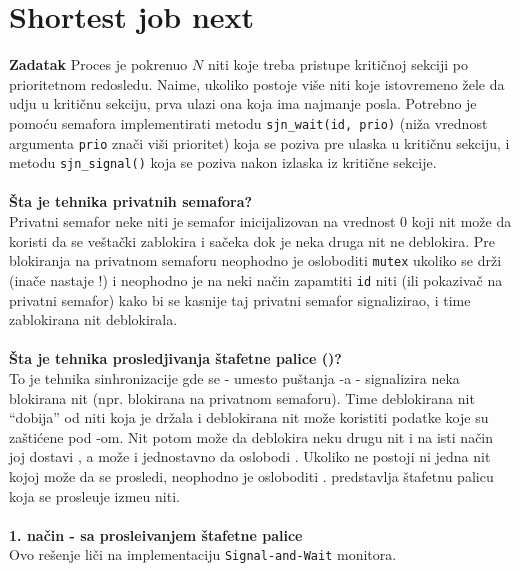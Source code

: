 \clearpage
\section{\latin Shortest job next}
\textbf{\large Zadatak} Proces je pokrenuo $N$ niti koje treba pristupe kriti\v{c}noj sekciji po prioritetnom redosledu. Naime, ukoliko postoje vi\v{s}e niti koje istovremeno \v{z}ele da udju u kriti\v{c}nu sekciju, prva ulazi ona koja ima najmanje posla. Potrebno je pomo\'{c}u semafora implementirati metodu \texttt{sjn\_wait(id, prio)} (ni\v{z}a vrednost argumenta \texttt{prio} zna\v{c}i vi\v{s}i prioritet) koja se poziva pre ulaska u kriti\v{c}nu sekciju, i metodu \texttt{sjn\_signal()} koja se poziva nakon izlaska iz kriti\v{c}ne sekcije.
\\\\
\textbf{\v{S}ta je tehnika privatnih semafora?}\\
Privatni semafor neke niti je semafor inicijalizovan na vrednost 0 koji nit mo\v{z}e da koristi da se ve\v{s}ta\v{c}ki zablokira i sa\v{c}eka dok je neka druga nit ne deblokira. Pre blokiranja na privatnom semaforu neophodno je osloboditi \texttt{mutex} ukoliko se dr\v{z}i (ina\v{c}e nastaje !) i neophodno je na neki na\v{c}in zapamtiti \texttt{id} niti (ili pokaziva\v{c} na privatni semafor) kako bi se kasnije taj privatni semafor signalizirao, i time zablokirana nit deblokirala.\\\\
\textbf{\v{S}ta je tehnika prosledjivanja \v{s}tafetne palice ()?}\\
To je tehnika sinhronizacije gde se - umesto pu\v{s}tanja -a - signalizira neka blokirana nit (npr. blokirana na privatnom semaforu). Time deblokirana nit ``dobija''  od niti koja je dr\v{z}ala  i deblokirana nit mo\v{z}e koristiti podatke koje su za\v{s}ti\'{c}ene pod -om. Nit potom mo\v{z}e da deblokira neku drugu nit i na isti na\v{c}in joj dostavi , a mo\v{z}e i jednostavno da oslobodi . Ukoliko ne postoji ni jedna nit kojoj  mo\v{z}e da se prosledi, neophodno je osloboditi .  predstavlja \v{s}tafetnu palicu koja se prosle\dj{}uje izme\dj{}u niti.
\\\\
\textbf{\large 1. na\v{c}in - sa prosle\dj{}ivanjem \v{s}tafetne palice}\\
Ovo re\v{s}enje li\v{c}i na implementaciju \texttt{Signal-and-Wait} monitora.
